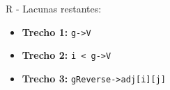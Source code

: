 \documentclass[12pt,a4paper,oneside]{article}
\begin{document}
\begin{enumerate}
	{\color{verde}
		R - Lacunas restantes:
			\begin{itemize}
				\item {\bf Trecho 1:} {\tt g->V}
				\item {\bf Trecho 2:} {\tt i < g->V}
				\item {\bf Trecho 3:} {\tt gReverse->adj[i][j]}
			\end{itemize}
	}
	
	\end{enumerate}
\end{document}
